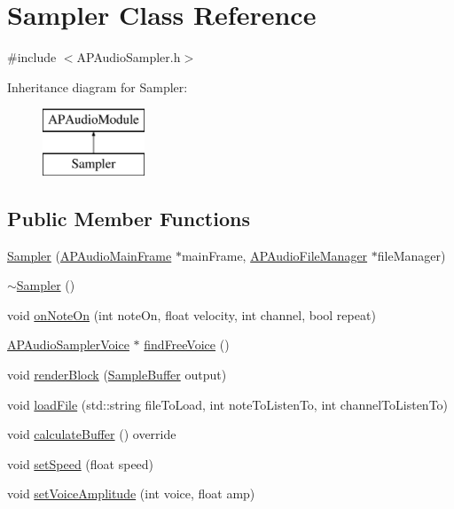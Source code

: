 \hypertarget{class_sampler}{\section{Sampler Class Reference}
\label{class_sampler}
}


{\ttfamily \#include $<$A\+P\+Audio\+Sampler.\+h$>$}

Inheritance diagram for Sampler\+:\begin{figure}[H]
\begin{center}
\leavevmode
\includegraphics[height=2.000000cm]{class_sampler}
\end{center}
\end{figure}
\subsection*{Public Member Functions}
\begin{DoxyCompactItemize}
\item 
\hyperlink{class_sampler_a4b1dae034b5a62d1111755ad575d520c}{Sampler} (\hyperlink{class_a_p_audio_main_frame}{A\+P\+Audio\+Main\+Frame} $\ast$main\+Frame, \hyperlink{class_a_p_audio_file_manager}{A\+P\+Audio\+File\+Manager} $\ast$file\+Manager)
\item 
\hyperlink{class_sampler_afbbbd238b78dd3024686c852b69fa64e}{$\sim$\+Sampler} ()
\item 
void \hyperlink{class_sampler_a59179aef89faa7fecccfed899a813a39}{on\+Note\+On} (int note\+On, float velocity, int channel, bool repeat)
\item 
\hyperlink{class_a_p_audio_sampler_voice}{A\+P\+Audio\+Sampler\+Voice} $\ast$ \hyperlink{class_sampler_af1cdbecc6b56d2f66f210919b70b4e9d}{find\+Free\+Voice} ()
\item 
void \hyperlink{class_sampler_a8eccc70de85144edcbae1d07ec148f25}{render\+Block} (\hyperlink{_a_p_audio_module_8h_a2c2f997fdc6b0e88b3723fb20dc502f0}{Sample\+Buffer} output)
\item 
void \hyperlink{class_sampler_a7cfe609d13791602b08426f639d47c70}{load\+File} (std\+::string file\+To\+Load, int note\+To\+Listen\+To, int channel\+To\+Listen\+To)
\item 
void \hyperlink{class_sampler_a1229142ba0a49229553e2cf1a525274d}{calculate\+Buffer} () override
\item 
void \hyperlink{class_sampler_afa02ace7d8c1c8e1890cb91f705a4579}{set\+Speed} (float speed)
\item 
void \hyperlink{class_sampler_a5f746f60864163e805bd8c8f198b1a29}{set\+Voice\+Amplitude} (int voice, float amp)
\end{DoxyCompactItemize}
